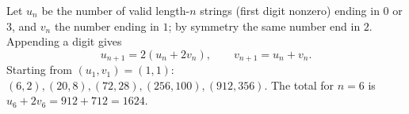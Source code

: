 Let $u_n$ be the number of valid length-$n$ strings (first digit nonzero) ending in $0$ or $3$, and $v_n$ the number ending in $1$; by symmetry the same number end in $2$. Appending a digit gives
\[u_{n+1}=2(u_n+2v_n),\qquad v_{n+1}=u_n+v_n.\]
Starting from $(u_1,v_1)=(1,1)$: $(6,2),(20,8),(72,28),(256,100),(912,356)$. The total for $n=6$ is $u_6+2v_6=912+712=\boxed{1624}$.

